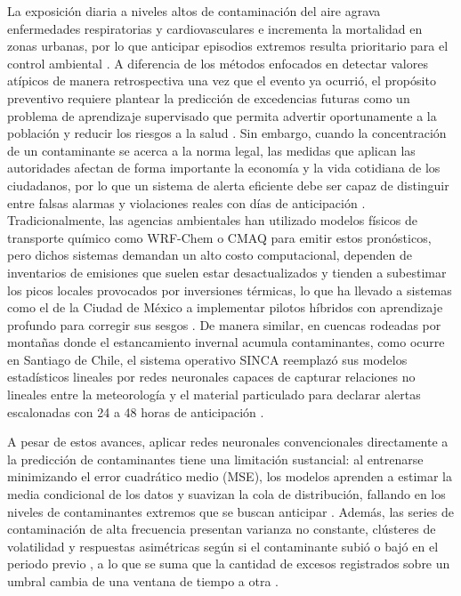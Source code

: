 \documentclass[11pt]{article}
\begin{document}
La exposición diaria a niveles altos de contaminación del aire agrava enfermedades respiratorias y cardiovasculares e incrementa la mortalidad en zonas urbanas, por lo que anticipar episodios extremos resulta prioritario para el control ambiental \cite{montero2011}. A diferencia de los métodos enfocados en detectar valores atípicos de manera retrospectiva una vez que el evento ya ocurrió, el propósito preventivo requiere plantear la predicción de excedencias futuras como un problema de aprendizaje supervisado que permita advertir oportunamente a la población y reducir los riesgos a la salud \cite{wilson2022deepgpd}. Sin embargo, cuando la concentración de un contaminante se acerca a la norma legal, las medidas que aplican las autoridades afectan de forma importante la economía y la vida cotidiana de los ciudadanos, por lo que un sistema de alerta eficiente debe ser capaz de distinguir entre falsas alarmas y violaciones reales con días de anticipación \cite{montero2011}. Tradicionalmente, las agencias ambientales han utilizado modelos físicos de transporte químico como WRF-Chem o CMAQ para emitir estos pronósticos, pero dichos sistemas demandan un alto costo computacional, dependen de inventarios de emisiones que suelen estar desactualizados y tienden a subestimar los picos locales provocados por inversiones térmicas, lo que ha llevado a sistemas como el de la Ciudad de México a implementar pilotos híbridos con aprendizaje profundo para corregir sus sesgos \cite{garciareynoso2026}. De manera similar, en cuencas rodeadas por montañas donde el estancamiento invernal acumula contaminantes, como ocurre en Santiago de Chile, el sistema operativo SINCA reemplazó sus modelos estadísticos lineales por redes neuronales capaces de capturar relaciones no lineales entre la meteorología y el material particulado para declarar alertas escalonadas con 24 a 48 horas de anticipación \cite{mma2021_calidadaire}.

A pesar de estos avances, aplicar redes neuronales convencionales directamente a la predicción de contaminantes tiene una limitación sustancial: al entrenarse minimizando el error cuadrático medio (MSE), los modelos aprenden a estimar la media condicional de los datos y suavizan la cola de distribución, fallando en los niveles de contaminantes extremos que se buscan anticipar \cite{wilson2022deepgpd}. Además, las series de contaminación de alta frecuencia presentan varianza no constante, clústeres de volatilidad y respuestas asimétricas según si el contaminante subió o bajó en el periodo previo \cite{montero2011}, a lo que se suma que la cantidad de excesos registrados sobre un umbral cambia de una ventana de tiempo a otra \cite{wilson2022deepgpd}. 
\end{document}

